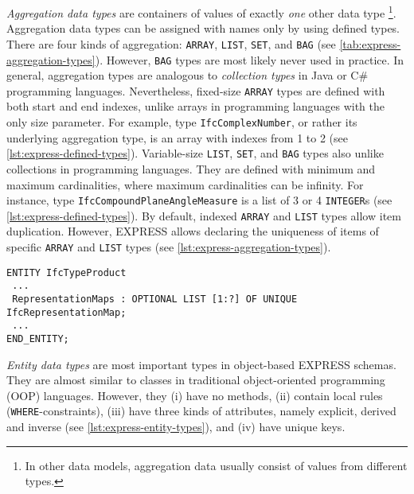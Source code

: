 \emph{Aggregation data types} are containers of values of exactly \emph{one} other data type
\footnote{In other data models, aggregation data usually consist of values from different types.}.
Aggregation data types can be assigned with names only by using defined types.
There are four kinds of aggregation: \texttt{ARRAY}, \texttt{LIST}, \texttt{SET}, and \texttt{BAG} (see \autoref{tab:express-aggregation-types}).
However, \texttt{BAG} types are most likely never used in practice.
In general, aggregation types are analogous to \emph{collection types} in Java or C{\#} programming languages.
Nevertheless, fixed-size \texttt{ARRAY} types are defined with both start and end indexes, unlike arrays in programming languages with the only size parameter.
For example, type \texttt{IfcComplexNumber}, or rather its underlying aggregation type, is an array with indexes from 1 to 2 (see \autoref{lst:express-defined-types}).
Variable-size \texttt{LIST}, \texttt{SET}, and \texttt{BAG} types also unlike collections in programming languages.
They are defined with minimum and maximum cardinalities, where maximum cardinalities can be infinity.
For instance, type \texttt{IfcCompoundPlaneAngleMeasure} is a list of 3 or 4 \texttt{INTEGER}s (see \autoref{lst:express-defined-types}).
By default, indexed \texttt{ARRAY} and \texttt{LIST} types allow item duplication.
However, EXPRESS allows declaring the uniqueness of items of specific \texttt{ARRAY} and \texttt{LIST} types (see \autoref{lst:express-aggregation-types}).


\begin{lstlisting}[caption={Example of \texttt{LIST} type with unique items},label=lst:express-aggregation-types]
ENTITY IfcTypeProduct
 ...
 RepresentationMaps : OPTIONAL LIST [1:?] OF UNIQUE IfcRepresentationMap;
 ...	
END_ENTITY;
\end{lstlisting}



% 
% 
\emph{Entity data types} are most important types in object-based EXPRESS schemas.
They are almost similar to classes in traditional object-oriented programming (OOP) languages.
However, they (i) have no methods, (ii) contain local rules (\texttt{WHERE}-constraints), 
(iii) have three kinds of attributes, namely explicit, derived and inverse (see \autoref{lst:express-entity-types}),
and (iv) have unique keys.


